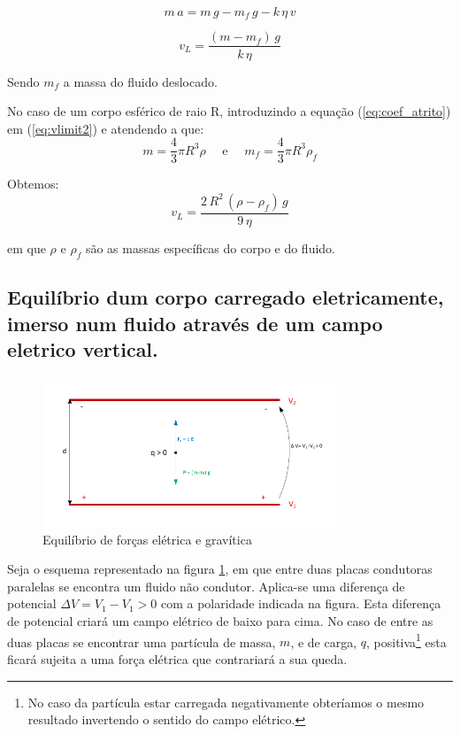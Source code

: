 \documentclass[a4paper,twoside,12pt]{article}      %
\begin{document}
\begin{equation}
	\label{eq:mov2}
	m\,a = m\,g - m_f\,g  - k  \, \eta \, v
\end{equation}


\begin{equation}
	\label{eq:vlimit2}
	v_L = \frac{(m - m_f)\,g}{k  \, \eta}
\end{equation}

Sendo $m_f$ a massa do fluido deslocado.

No caso de um corpo esférico de raio R, introduzindo a equação (\ref{eq:coef_atrito}) em (\ref{eq:vlimit2}) e atendendo a que:
\begin{equation*}
	m = \frac{4}{3} \pi R^3 \rho \quad \textrm{  e } \quad  m_f = \frac{4}{3} \pi R^3 \rho_f
\end{equation*}

Obtemos:
\begin{equation}
	\label{eq:vlimit3}
	v_L = \frac{2\,R^2\, (\rho - \rho_f)\,g}{9  \, \eta}
\end{equation}

em que $\rho$  e $\rho_f$ são as massas específicas do corpo e do fluido.

%
\subsection{\sf Equilíbrio dum corpo carregado eletricamente, imerso num fluido através de um campo eletrico vertical.}

\begin{figure}
	[!htb]  \centering 
	\includegraphics[width=0.8\textwidth]{./F_equil}
	\caption{Equilíbrio de forças elétrica e gravítica \label{fig:f_equil}} 
\end{figure}

Seja o esquema representado na figura \ref{fig:f_equil}, em que entre duas placas condutoras paralelas se encontra um fluido não condutor. Aplica-se uma diferença de potencial $\Delta V = V_1 -V_1 > 0$ com a polaridade indicada na figura. Esta diferença de potencial criará um campo elétrico de baixo para cima. No caso de entre as duas placas se encontrar uma partícula de massa, $m$, e de carga, $q$, positiva\footnote{No caso da partícula estar carregada negativamente obteríamos o mesmo resultado invertendo o sentido do campo elétrico.} esta ficará sujeita a uma força elétrica que contrariará a sua queda.
\end{document}
